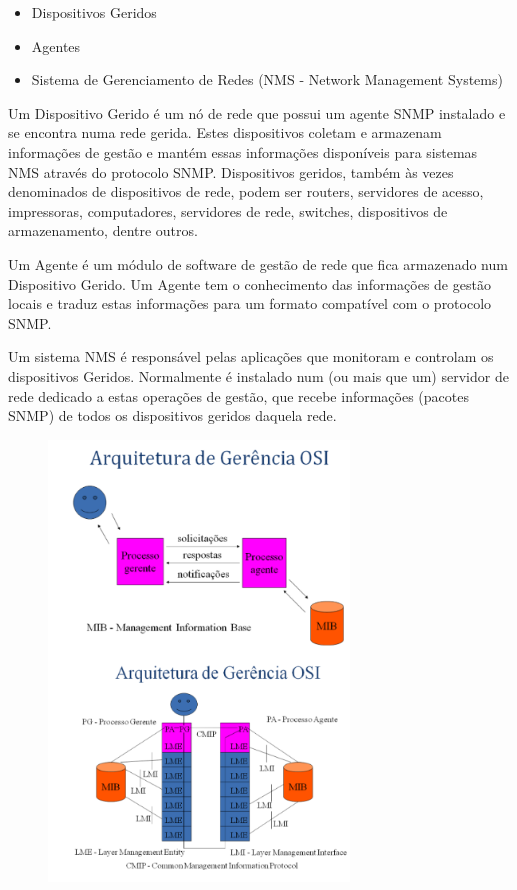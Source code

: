\documentclass[10pt]{article}
\begin{document}
\begin{enumerate}
        \begin{itemize}
            \item Dispositivos Geridos
            \item Agentes
            \item Sistema de Gerenciamento de Redes (NMS - Network
                Management Systems)
        \end{itemize}
       
        Um Dispositivo Gerido é um nó de rede que possui um agente SNMP 
        instalado e se encontra numa rede gerida. Estes dispositivos coletam
        e armazenam informações de gestão e mantém essas informações disponíveis
        para sistemas NMS através do protocolo SNMP. Dispositivos geridos, também
        às vezes denominados de dispositivos de rede, podem ser routers, servidores
        de acesso, impressoras, computadores, servidores de rede, switches, 
        dispositivos de armazenamento, dentre outros.

        Um Agente é um módulo de software de gestão de rede que fica armazenado
        num Dispositivo Gerido. Um Agente tem o conhecimento das informações
        de gestão locais e traduz estas informações para um formato compatível
        com o protocolo SNMP.

        Um sistema NMS é responsável pelas aplicações que monitoram e controlam
        os dispositivos Geridos. Normalmente é instalado num (ou mais que um)  servidor de rede dedicado a estas operações de gestão, que recebe 
        informações (pacotes SNMP) de todos os dispositivos geridos daquela
        rede. 
        
    \begin{figure}[h!]
        \centering
         \includegraphics[width=80mm]{figura.png}
        \label{fig:figura1}
    \end{figure}
    

\end{enumerate}
\end{document}

